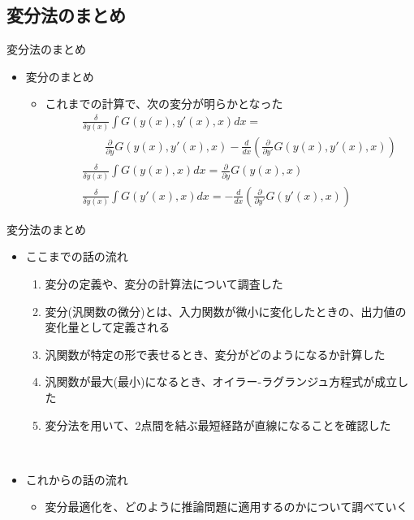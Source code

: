\documentclass[dvipdfmx,notheorems,t]{beamer}
\begin{document}
\subsection{変分法のまとめ}

\begin{frame}{変分法のまとめ}

\begin{itemize}
	\item 変分のまとめ
	\begin{itemize}
		\item これまでの計算で、次の変分が明らかとなった
		\begin{eqnarray}
			&& \frac{\delta}{\delta y(x)} \int G(y(x), y'(x), x) dx = \nonumber \\
			&& \qquad \frac{\partial}{\partial y} G(y(x), y'(x), x) - \frac{d}{dx} \left( \frac{\partial}{\partial y'} G(y(x), y'(x), x) \right) \\
			&& \frac{\delta}{\delta y(x)} \int G(y(x), x) dx = \frac{\partial}{\partial y} G(y(x), x) \\
			&& \frac{\delta}{\delta y(x)} \int G(y'(x), x) dx = - \frac{d}{dx} \left( \frac{\partial}{\partial y'} G(y'(x), x) \right)
		\end{eqnarray}
	\end{itemize}
\end{itemize}

\end{frame}

\begin{frame}{変分法のまとめ}

\begin{itemize}
	\item ここまでの話の流れ
	\begin{enumerate}
		\item 変分の定義や、変分の計算法について調査した
		\newline
		\item \alert{変分}(汎関数の微分)とは、入力関数が微小に変化したときの、出力値の変化量として定義される
		\newline
		\item 汎関数が特定の形で表せるとき、変分がどのようになるか計算した
		\item 汎関数が最大(最小)になるとき、\alert{オイラー-ラグランジュ方程式}が成立した
		\newline
		\item 変分法を用いて、2点間を結ぶ最短経路が\alert{直線}になることを確認した
	\end{enumerate} \
	
	\item これからの話の流れ
	\begin{itemize}
		\item 変分最適化を、どのように推論問題に適用するのかについて調べていく
	\end{itemize}
\end{itemize}

\end{frame}
\end{document}
